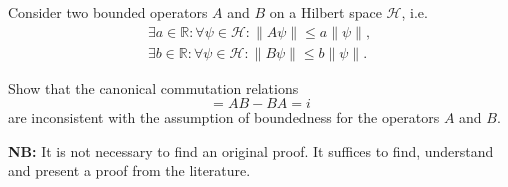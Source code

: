 \begin{Problem}
Consider two bounded operators $A$ and $B$ on a Hilbert space $\mathcal{H}$, i.e.
\begin{subequations}
	\begin{align}
		\exists a \in \mathbb{R} : \forall \psi \in \mathcal{H} : \|A \psi\| \leq a \|\psi\|, \label{1a} \\
		\exists b \in \mathbb{R} : \forall \psi \in \mathcal{H} : \|B \psi\| \leq b \|\psi\|. \label{1b}
	\end{align}
\end{subequations}

Show that the canonical commutation relations
\begin{equation}
	[A,B] = AB - BA = i
\end{equation}
are inconsistent with the assumption of boundedness for the operators $A$ and $B$.

\noindent \textbf{NB:} It is not necessary to find an original proof. It suffices to find, understand and present a proof from the literature.
\end{Problem}

